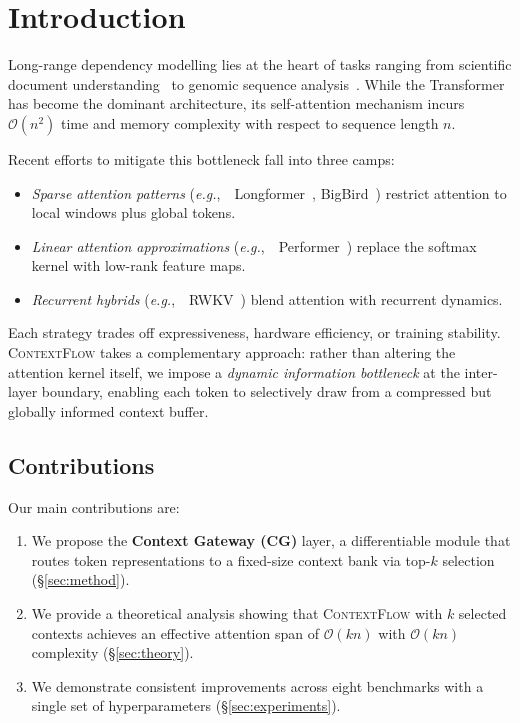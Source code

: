\documentclass[10pt,twocolumn]{article}
\theoremstyle{plain}
\theoremstyle{definition}
\theoremstyle{remark}
\newcommand{\modelname}{\textsc{ContextFlow}}
\newcommand{\eg}{\textit{e.g.},\ }
\begin{document}
\section{Introduction}
\label{sec:intro}

Long-range dependency modelling lies at the heart of tasks ranging from
scientific document understanding~\cite{lo2020s2orc} to genomic sequence
analysis~\cite{ji2021dnabert}. While the Transformer~\cite{vaswani2017attention}
has become the dominant architecture, its self-attention mechanism incurs
$\mathcal{O}(n^2)$ time and memory complexity with respect to sequence length $n$.

Recent efforts to mitigate this bottleneck fall into three camps:
\begin{itemize}
  \item \emph{Sparse attention patterns} (\eg~Longformer~\cite{beltagy2020longformer},
        BigBird~\cite{zaheer2020bigbird}) restrict attention to local windows plus
        global tokens.
  \item \emph{Linear attention approximations} (\eg~Performer~\cite{choromanski2020rethinking})
        replace the softmax kernel with low-rank feature maps.
  \item \emph{Recurrent hybrids} (\eg~RWKV~\cite{peng2023rwkv}) blend attention
        with recurrent dynamics.
\end{itemize}

Each strategy trades off expressiveness, hardware efficiency, or training
stability. \modelname{} takes a complementary approach: rather than altering the
attention kernel itself, we impose a \emph{dynamic information bottleneck} at the
inter-layer boundary, enabling each token to selectively draw from a compressed
but globally informed context buffer.

\subsection{Contributions}

Our main contributions are:

\begin{enumerate}[label=\textbf{\arabic*.}]
  \item We propose the \textbf{Context Gateway (CG)} layer, a differentiable
        module that routes token representations to a fixed-size context bank via
        top-$k$ selection (\S\ref{sec:method}).
  \item We provide a theoretical analysis showing that \modelname{} with $k$
        selected contexts achieves an effective attention span of
        $\mathcal{O}(kn)$ with $\mathcal{O}(kn)$ complexity (\S\ref{sec:theory}).
  \item We demonstrate consistent improvements across eight benchmarks with a
        single set of hyperparameters (\S\ref{sec:experiments}).
\end{enumerate}
\end{document}
